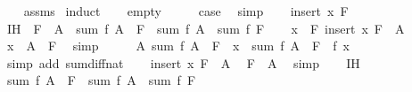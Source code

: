 \begin{isabellebody}
%
\isadelimproof
\ \ %
\endisadelimproof
%
\isatagproof
{}\isamarkupfalse%
\ assms\isanewline
{}\isamarkupfalse%
\ induct\isanewline
\ \ \isamarkupfalse%
\ empty\isanewline
\ \ \isamarkupfalse%
\ \isamarkupfalse%
\ {\isacharquery}{\kern0pt}case\ \isamarkupfalse%
\ simp\isanewline
{}\isamarkupfalse%
\isanewline
\ \ \isamarkupfalse%
\ {\isacharparenleft}{\kern0pt}insert\ x\ F{\isacharparenright}{\kern0pt}\isanewline
\ \ \isamarkupfalse%
\ IH\ {\isacharequal}{\kern0pt}\ {\isacartoucheopen}F\ {\isasymsubseteq}\ A\ {\isasymLongrightarrow}\ sum\ f\ {\isacharparenleft}{\kern0pt}A\ {\isacharminus}{\kern0pt}\ F{\isacharparenright}{\kern0pt}\ {\isacharequal}{\kern0pt}\ sum\ f\ A\ {\isacharminus}{\kern0pt}\ sum\ f\ F{\isacartoucheclose}\isanewline
\ \ \isamarkupfalse%
\ {\isacartoucheopen}x\ {\isasymnotin}\ F{\isacartoucheclose}\ {\isacartoucheopen}insert\ x\ F\ {\isasymsubseteq}\ A{\isacartoucheclose}\ \isamarkupfalse%
\ {\isachardoublequoteopen}x\ {\isasymin}\ A\ {\isacharminus}{\kern0pt}\ F{\isachardoublequoteclose}\ \isamarkupfalse%
\ simp\isanewline
\ \ \isamarkupfalse%
\ \isamarkupfalse%
\ A{\isacharcolon}{\kern0pt}\ {\isachardoublequoteopen}sum\ f\ {\isacharparenleft}{\kern0pt}{\isacharparenleft}{\kern0pt}A\ {\isacharminus}{\kern0pt}\ F{\isacharparenright}{\kern0pt}\ {\isacharminus}{\kern0pt}\ {\isacharbraceleft}{\kern0pt}x{\isacharbraceright}{\kern0pt}{\isacharparenright}{\kern0pt}\ {\isacharequal}{\kern0pt}\ sum\ f\ {\isacharparenleft}{\kern0pt}A\ {\isacharminus}{\kern0pt}\ F{\isacharparenright}{\kern0pt}\ {\isacharminus}{\kern0pt}\ f\ x{\isachardoublequoteclose}\isanewline
\ \ \ \ \isamarkupfalse%
\ {\isacharparenleft}{\kern0pt}simp\ add{\isacharcolon}{\kern0pt}\ sum{\isacharunderscore}{\kern0pt}diff{}{\isacharunderscore}{\kern0pt}nat{\isacharparenright}{\kern0pt}\isanewline
\ \ \isamarkupfalse%
\ {\isacartoucheopen}insert\ x\ F\ {\isasymsubseteq}\ A{\isacartoucheclose}\ \isamarkupfalse%
\ {\isachardoublequoteopen}F\ {\isasymsubseteq}\ A{\isachardoublequoteclose}\ \isamarkupfalse%
\ simp\isanewline
\ \ \isamarkupfalse%
\ IH\ \isamarkupfalse%
\ {\isachardoublequoteopen}sum\ f\ {\isacharparenleft}{\kern0pt}A\ {\isacharminus}{\kern0pt}\ F{\isacharparenright}{\kern0pt}\ {\isacharequal}{\kern0pt}\ sum\ f\ A\ {\isacharminus}{\kern0pt}\ sum\ f\ F{\isachardoublequoteclose}\ \isamarkupfalse%

\end{isabellebody}
